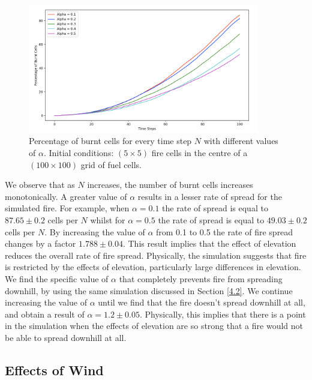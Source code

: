 \begin{figure}[H]
\begin{center}
\includegraphics[width=0.9\textwidth]{Figures/f3.png}
\caption{Percentage of burnt cells for every time step $N$ with different values of $\alpha$. Initial conditions: $(5\times5)$ fire cells in the centre of a $(100\times 100)$ grid of fuel cells.} 
\label{f44}
\end{center}
\end{figure}

\noindent We observe that as $N$ increases, the number of burnt cells increases monotonically. A greater value of $\alpha$ results in a lesser rate of spread for the simulated fire. For example, when $\alpha=0.1$ the rate of spread is equal to $87.65\pm0.2$ cells per $N$ whilst for $\alpha=0.5$ the rate of spread is equal to $49.03\pm0.2$ cells per $N$. By increasing the value of $\alpha$ from 0.1 to 0.5 the rate of fire spread changes by a factor $1.788\pm0.04$. This result implies that the effect of elevation reduces the overall rate of fire spread. Physically, the simulation suggests that fire is restricted by the effects of elevation, particularly large differences in elevation. We find the specific value of $\alpha$ that completely prevents fire from spreading downhill, by using the same simulation discussed in Section \ref{4.2}. We continue increasing the value of $\alpha$ until we find that the fire doesn't spread downhill at all, and obtain a result of $\alpha=1.2\pm0.05$. Physically, this implies that there is a point in the simulation when the effects of elevation are so strong that a fire would not be able to spread downhill at all.

\subsection{Effects of Wind}\label{4.3}


